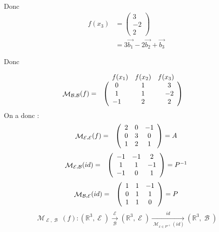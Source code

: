 \documentclass[a4paper,12pt]{article}
\DeclareMathOperator{\M}{\mathcal{M}}
\DeclareMathOperator{\B}{\mathcal{B}}
\DeclareMathOperator{\E}{\mathcal{E}}
\begin{document}
Donc 
\begin{align*}
    f(x_3)&=\begin{pmatrix}3\\-2\\2\end{pmatrix} \\
    &=3\vec{b_1}-2\vec{b_2}+\vec{b_3}
\end{align*}

Donc

$$
\begin{array}{ccc} 
    &\begin{array}{ccc} f(x_1)&f(x_2)&f(x_3) \end{array} & \\
    \M_{\B,\B}(f)=&\left(\begin{array}{c@{\hspace*{3em}}c@{\hspace*{3em}}c}
            0&1&3\\
            1&1&-2\\
            -1&2&2 \end{array} \right) 
\end{array}
$$
\clearpage
On a donc :
$$
\begin{array}{ccc} 
\M_{\E,\E}(f)=&\left(\begin{array}{c@{\hspace*{1em}}c@{\hspace*{1em}}c}
        2&0&-1\\
        0&3&0\\
        1&2&1 \end{array} \right) 
        =A
\end{array}
$$
$$
\begin{array}{ccc} 
\M_{\E,\B}(id)=&\left(\begin{array}{c@{\hspace*{1em}}c@{\hspace*{1em}}c}
        -1&-1&2\\
        1&1&-1\\
        -1&0&1 \end{array} \right)
        =P^{-1}
\end{array}
$$
$$
\begin{array}{ccc} 
\M_{\B,\E}(id)=&\left(\begin{array}{c@{\hspace*{1em}}c@{\hspace*{1em}}c}
        1&1&-1\\
        0&1&1\\
        1&1&0 \end{array} \right)
        =P
\end{array}
$$
\bigskip
$$
\M_{\E,\B}(f):(\mathbb{R}^3,\E)\xrightarrow[\B]{\E}(\mathbb{R}^3,\E)\xrightarrow[\M_{x\in P^{-1}}(id)]{id}(\mathbb{R}^3,\B)
$$
\vspace{4ex}
\end{document}
